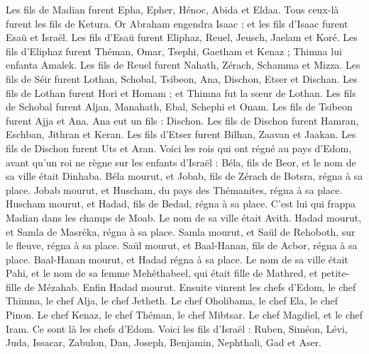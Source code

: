 \begin{multicols}{2}
Les fils de Madian furent Epha, Epher, Hénoc, Abida et Eldaa. Tous ceux-là furent les fils de Ketura.
Or Abraham engendra Isaac ; et les fils d'Isaac furent Esaü et Israël.
Les fils d'Esaü furent Eliphaz, Reuel, Jeusch, Jaelam et Koré.
Les fils d'Eliphaz furent Théman, Omar, Tsephi, Gaetham et Kenaz ; Thimna lui enfanta Amalek.
Les fils de Reuel furent Nahath, Zérach, Schamma et Mizza.
Les fils de Séir furent Lothan, Schobal, Tsibeon, Ana, Dischon, Etser et Dischan.
Les fils de Lothan furent Hori et Homam ; et Thimna fut la sœur de Lothan.
Les fils de Schobal furent Aljan, Manahath, Ebal, Schephi et Onam. Les fils de Tsibeon furent Ajja et Ana.
Ana eut un fils : Dischon. Les fils de Dischon furent Hamran, Eschban, Jithran et Keran.
Les fils d'Etser furent Bilhan, Zaavan et Jaakan. Les fils de Dischon furent Uts et Aran.
Voici les rois qui ont régné au pays d'Edom, avant qu'un roi ne règne sur les enfants d'Israël : Béla, fils de Beor, et le nom de sa ville était Dinhaba.
Béla mourut, et Jobab, fils de Zérach de Botsra, régna à sa place.
Jobab mourut, et Huscham, du pays des Thémanites, régna à sa place.
Huscham mourut, et Hadad, fils de Bedad, régna à sa place. C'est lui qui frappa Madian dans les champs de Moab. Le nom de sa ville était Avith.
Hadad mourut, et Samla de Masréka, régna à sa place.
Samla mourut, et Saül de Rehoboth, sur le fleuve, régna à sa place.
Saül mourut, et Baal-Hanan, fils de Acbor, régna à sa place.
Baal-Hanan mourut, et Hadad régna à sa place. Le nom de sa ville était Pahi, et le nom de sa femme Mehéthabeel, qui était fille de Mathred, et petite- fille de Mézahab.
Enfin Hadad mourut. Ensuite vinrent les chefs d'Edom, le chef Thimna, le chef Alja, le chef Jetheth.
Le chef Oholibama, le chef Ela, le chef Pinon.
Le chef Kenaz, le chef Théman, le chef Mibtsar.
Le chef Magdiel, et le chef Iram. Ce sont là les chefs d'Edom.
\VerseOne{}Voici les fils d'Israël : Ruben, Siméon, Lévi, Juda, Issacar, Zabulon,
Dan, Joseph, Benjamin, Nephthali, Gad et Aser.

\end{multicols}
